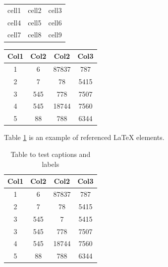 \documentclass[12pt, letterpaper]{report}
\begin{document}
    \begin{center}
        \begin{tabular}{ |c|c|c| }
            \hline

                cell1 & cell2 & cell3 \\
                cell4 & cell5 & cell6 \\
                cell7 & cell8 & cell9 \\
            \hline
        \end{tabular}
    \end{center}


    \begin{center}
        \begin{tabular}{||c c c c||} 
            \hline
            Col1 & Col2 & Col2 & Col3 \\ [0.5ex] 
            \hline\hline
            1 & 6 & 87837 & 787 \\ 
            \hline
            2 & 7 & 78 & 5415 \\
            \hline
            3 & 545 & 778 & 7507 \\
            \hline
            4 & 545 & 18744 & 7560 \\
            \hline
            5 & 88 & 788 & 6344 \\ [1ex] 
            \hline
            \end{tabular}
       \end{center}

    Table \ref{table:data} is an example of referenced \LaTeX{} elements.

    \begin{table}[h!]
        \centering
        \begin{tabular}{||c c c c||} 
            \hline
            Col1 & Col2 & Col2 & Col3 \\ [0.5ex] 
            \hline\hline
            1 & 6 & 87837 & 787 \\ 
            2 & 7 & 78 & 5415 \\
            3 & 545 & 7& 5415 \\
            3 & 545 & 778 & 7507 \\
            4 & 545 & 18744 & 7560 \\
            5 & 88 & 788 & 6344 \\ [1ex] 
            \hline
        \end{tabular}
        \caption{Table to test captions and labels}
        \label{table:data}
    \end{table}





    
\end{document}
